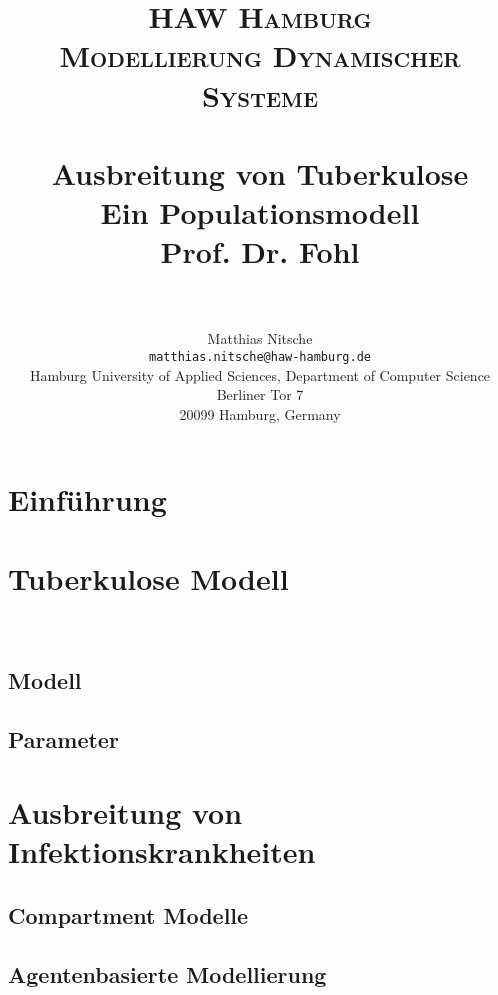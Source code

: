 \documentclass[paper=a4, fontsize=11pt, ngerman, abstract=on]{scrartcl}
\title {
  \normalfont \normalsize
  \textsc{HAW Hamburg} \\ [25pt]
  \textsc{Modellierung Dynamischer Systeme} \\ [15pt]
  \horrule{0.5pt} \\[0.4cm] %
  \huge Ausbreitung von Tuberkulose \\ [15pt] %
  \small Ein Populationsmodell \\ [15pt]
  \small Prof. Dr. Fohl \\
  \horrule{1pt} \\[0.5cm] %
}
\author{
  Matthias Nitsche \\
  \texttt{matthias.nitsche@haw-hamburg.de} \\
  \small{Hamburg University of Applied Sciences, Department of Computer Science} \\
  \small{Berliner Tor 7} \\
  \small{20099 Hamburg, Germany} \\
}
\numberwithin{equation}{section} %
\numberwithin{figure}{section} %
\numberwithin{table}{section} %
\begin{document}
\maketitle

\begin{abstract}
\blindtext
\end{abstract}

\newpage

\renewcommand{\cftsecleader}{\cftdotfill{\cftdotsep}}
\tableofcontents

\newpage

\section{Einführung}

\blindtext

\section{Tuberkulose Modell}

\cite{WHOTB2016} \\
\cite{WHOTBGuidelines2017}

\blindtext

\subsection{Modell}

\blindtext

\subsection{Parameter}

\blindtext

\section{Ausbreitung von Infektionskrankheiten}

\blindtext

\subsection{Compartment Modelle}

\blindtext

\subsection{Agentenbasierte Modellierung}
\end{document}
